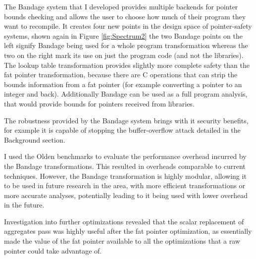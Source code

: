 The Bandage system that I developed provides multiple backends for pointer bounds checking and allows the user to choose how much of their program they want to recompile.
It creates four new points in the design space of pointer-safety systems, shown again in Figure \ref{fig:Spectrum2} the two Bandage points on the left signify Bandage being used for a whole program transformation whereas the two on the right mark its use on just the program code (and not the libraries).
The lookup table transformation provides slightly more complete safety than the fat pointer transformation, because there are C operations that can strip the bounds information from a fat pointer (for example converting a pointer to an integer and back).
Additionally Bandage can be used as a full program analysis, that would provide bounds for pointers received from libraries.




The robustness provided by the Bandage system brings with it security benefits, for example it is capable of stopping the buffer-overflow attack detailed in the Background section.

I used the Olden benchmarks to evaluate the performance overhead incurred by the Bandage transformations.
This resulted in overheads comparable to current techniques.
However, the Bandage transformation is highly modular, allowing it to be used in future research in the area, with more efficient transformations or more accurate analyses, potentially leading to it being used with lower overhead in the future.

Investigation into further optimizations revealed that the scalar replacement of aggregates pass was highly useful after the fat pointer optimization, as essentially made the value of the fat pointer available to all the optimizations that a raw pointer could take advantage of.
